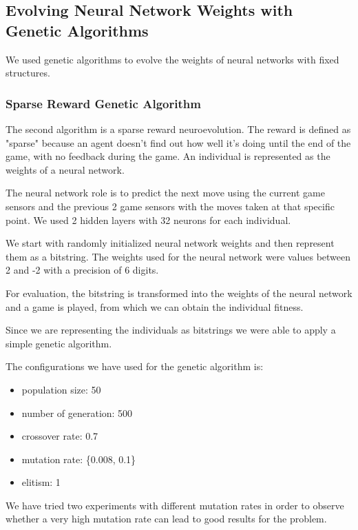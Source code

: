 \documentclass[conference]{IEEEtran}
\begin{document}
    \subsection{Evolving Neural Network Weights with Genetic Algorithms}\label{subsec:evolving-neural-network-weights-with-genetic-algorithms}
    We used genetic algorithms to evolve the weights of neural networks with fixed structures.

    \subsubsection{Sparse Reward Genetic Algorithm}
    The second algorithm is a sparse reward neuroevolution\cite{neuro}.
    The reward is defined as "sparse" because an agent doesn't find out how well it's doing until
    the end of the game, with no feedback during the game.
    An individual is represented as the weights of a neural network.

    The neural network role is to predict the next move using the current game sensors and
    the previous 2 game sensors with the moves taken at that specific point.
    We used 2 hidden layers with 32 neurons for each individual.

    We start with randomly initialized neural network weights and then represent them as a bitstring.
    The weights used for the neural network were values between 2 and -2 with a precision of 6 digits.

    For evaluation, the bitstring is transformed into the weights of the neural network and a game is played,
    from which we can obtain the individual fitness.

    Since we are representing the individuals as bitstrings we were able to apply
    a simple genetic algorithm\cite{genetic_algorithm}.

    The configurations we have used for the genetic algorithm is:
    \begin{itemize}
        \item population size: 50
        \item number of generation: 500
        \item crossover rate: 0.7
        \item mutation rate: \{0.008, 0.1\}
        \item elitism: 1
    \end{itemize}
    We have tried two experiments with different mutation rates in order to observe whether a very high
    mutation rate can lead to good results for the problem. \\
\end{document}
